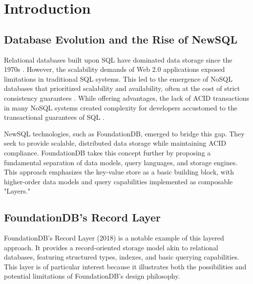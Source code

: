 \documentclass[sigconf]{acmart}
\begin{document}


\maketitle

\section{Introduction}
\subsection{Database Evolution and the Rise of NewSQL}
Relational databases built upon SQL have dominated data storage since the 1970s \cite{CoddTheory}. However, the scalability demands of Web 2.0 applications exposed limitations in traditional SQL systems. This led to the emergence of NoSQL databases that prioritized scalability and availability, often at the cost of strict consistency guarantees \cite{NewSQL}. While offering advantages, the lack of ACID transactions in many NoSQL systems created complexity for developers accustomed to the transactional guarantees of SQL \cite{NewSQL}.

NewSQL technologies, such as FoundationDB, emerged to bridge this gap. They seek to provide scalable, distributed data storage while maintaining ACID compliance. FoundationDB takes this concept further by proposing a fundamental separation of data models, query languages, and storage engines\cite{FoundationDBPaper}. This approach emphasizes the key-value store as a basic building block, with higher-order data models and query capabilities implemented as composable "Layers."

\subsection{FoundationDB's Record Layer}
FoundationDB's Record Layer (2018) is a notable example of this layered approach. It provides a record-oriented storage model akin to relational databases, featuring structured types, indexes, and basic querying capabilities. This layer is of particular interest because it illustrates both the possibilities and potential limitations of FoundationDB's design philosophy.
\end{document}
